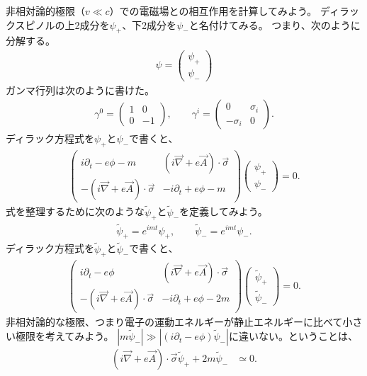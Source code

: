 \documentclass[10pt,a4paper]{jarticle}
\begin{document}
非相対論的極限（$v \ll c$）での電磁場との相互作用を計算してみよう。
ディラックスピノルの上2成分を$\psi_+$、下2成分を$\psi_-$と名付けてみる。
つまり、次のように分解する。
\begin{align}
\psi = \left(\begin{array}{c}
\psi_+ \\
\psi_-
\end{array}\right)
\end{align}
ガンマ行列は次のように書けた。
\begin{align}
\gamma^0 = \left(\begin{array}{cc}
1 & 0 \\
0 &-1 
\end{array}\right), \qquad
\gamma^i = \left(\begin{array}{cc}
0 & \sigma_i \\
-\sigma_i & 0
\end{array}\right).
\end{align}
%
ディラック方程式を$\psi_+$と$\psi_-$で書くと、
\begin{align}
\left(
\begin{array}{cc}
 i\partial_t - e \phi - m                   & (i\vec\nabla + e \vec A ) \cdot \vec\sigma\\
-(i\vec\nabla + e \vec A ) \cdot \vec\sigma & -i\partial_t + e \phi - m
\end{array}
\right)
\left(
\begin{array}{c}
\psi_+ \\
\psi_-
\end{array}
\right)
= 0.
\end{align}
%
式を整理するために次のような$\tilde \psi_+$と$\tilde\psi_-$を定義してみよう。
\begin{align}
\tilde\psi_+ = e^{imt} \psi_+, \qquad
\tilde\psi_- = e^{imt} \psi_-.
\end{align}
%
ディラック方程式を$\tilde\psi_+$と$\tilde\psi_-$で書くと、
\begin{align}
\left(
\begin{array}{cc}
 i\partial_t - e \phi                       & (i\vec\nabla + e \vec A ) \cdot \vec\sigma\\
-(i\vec\nabla + e \vec A ) \cdot \vec\sigma & -i\partial_t + e \phi - 2m
\end{array}
\right)
\left(
\begin{array}{c}
\tilde\psi_+ \\
\tilde\psi_-
\end{array}
\right)
= 0.
\label{eq:eq:dirac eq with Amu matrix}
\end{align}
%
非相対論的な極限、つまり電子の運動エネルギーが静止エネルギーに比べて小さい極限を考えてみよう。
$|m\tilde\psi_-| \gg |( i\partial_t - e \phi) \tilde\psi_-|$に違いない。ということは、
\begin{align}
(  i \vec\nabla + e\vec A) \cdot \vec\sigma \tilde\psi_+ + 2m \tilde\psi_- &\simeq 0.
\end{align}
\end{document}
